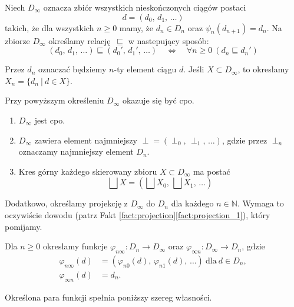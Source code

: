 \begin{definicja}%
Niech \(D_\infty\) oznacza zbiór wszystkich nieskończonych ciągów postaci
\[
d=(d_0,\,d_1,\,\dots)
\]
takich, że dla wszystkich \(n\geq 0\) mamy, że \(d_n\in D_n\) oraz \(\psi_n (d_{n+1}) = d_n\). 
Na zbiorze \(D_\infty\) określamy relację \(\sqsubseteq\) w nastepujący sposób:
\[
(d_0,\,d_1,\,\dots) \sqsubseteq (d_0',\,d_1',\,\dots) \quad \Leftrightarrow\quad  \forall n\geq 0\  (d_n\sqsubseteq d_n') 
\]

  Przez \(d_n\) oznaczać będziemy \(n\)-ty element ciągu \(d\). Jeśli \(X\subset D_\infty\), to okreslamy \(X_n=\{ d_n\ |\ d\in X\}\).

\end{definicja}

Przy powyższym określeniu \(D_\infty\) okazuje się być cpo.

\begin{fakt}%
\begin{enumerate}[label={(\roman*)}, ref={(\roman*)}] 
  \setlength\itemsep{0em}
\item \(D_\infty\) jest cpo.
\item \(D_\infty\) zawiera element najmniejszy \(\perp=(\perp_0,\,\perp_1,\,\dots)\), gdzie przez \(\perp_n\) oznaczamy najmniejszy element \(D_n\).
\item Kres górny każdego skierowany zbioru \(X\subset D_\infty\) ma postać
\[
\bigsqcup X = (\bigsqcup X_0,\,\bigsqcup X_1,\,\dots)
\]
\end{enumerate}
\end{fakt}

Dodatkowo, określamy projekcję z \(D_\infty\) do \(D_n\) dla każdego \(n\in\mathbb{N}\).
Wymaga to oczywiście dowodu (patrz Fakt \ref{fact:projection}\ref{fact:projection_1}), który pomijamy.

\begin{definicja}[\(D_\infty\)]%
Dla \(n\geq 0\) okreslamy funkcje \(\varphi_{n\infty}:D_n\to D_\infty\) oraz \(\varphi_{\infty n}: D_\infty \to D_n\), gdzie 
\begin{align*}
\varphi_{n\infty}(d) &= (\varphi_{n0}(d),\,\varphi_{n1}(d),\,\dots)\ \text{dla}\ d\in D_n,\\
\varphi_{\infty n}(d) &= d_n.
\end{align*}
\end{definicja}

Określona para funkcji spełnia poniższy szereg własności.


